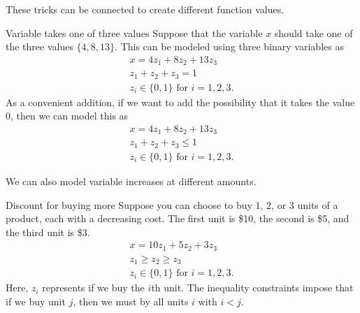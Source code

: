 These tricks can be connected to create different function values.  

\begin{example}{Variable takes one of three values}{}
Suppose that the variable $x$ should take one of the three values $\{4, 8, 13\}$. This can be modeled using three binary variables as
\begin{align*}
x=4z_1 +8z_2 +13z_3\\
 z_1 +z_2 +z_3 =1\\
z_i \in \{0, 1\} \text{ for } i = 1, 2,3.
\end{align*}
As a convenient addition, if we want to add the possibility that it takes the value $0$, then we can model this as 
\begin{align*}
x=4z_1 +8z_2 +13z_3\\
 z_1 +z_2 +z_3 \leq 1\\
z_i \in \{0, 1\} \text{ for } i = 1, 2,3.
\end{align*}
\end{example}


We can also model variable increases at different amounts.  \begin{example}{Discount for buying more}{}
Suppose you can choose to buy 1, 2, or 3 units of a product, each with a decreasing cost.  The first unit is \$10, the second is \$5, and the third unit is \$3.
\begin{align*}
x=10z_1 +5z_2 +3z_3\\
 z_1\geq z_2 \geq z_3\\
z_i \in \{0, 1\} \text{ for } i = 1, 2,3.
\end{align*}
Here, $z_i$ represents if we buy the $i$th unit.  The inequality constraints impose that if we buy unit $j$, then we must by all units $i$ with $i < j$.
\end{example}










